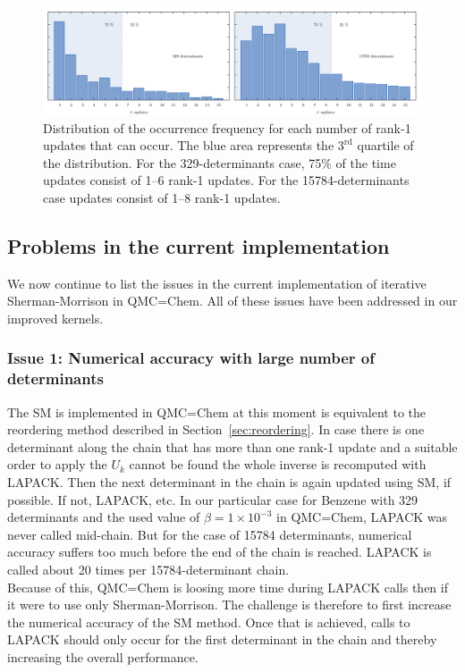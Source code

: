 \documentclass[11pt]{article}
\numberwithin{figure}{section}
\numberwithin{table}{section}
\begin{document}
    \begin{figure}[h]
    	\centering
    	\includegraphics[width=1\textwidth]{upd_freq_hor.png}
    	\caption{Distribution of the occurrence frequency for each number of rank-1 updates that can occur. The blue area represents the $3^\mathrm{rd}$ quartile of the distribution. For the 329-determinants case, 75\% of the time updates consist of 1--6 rank-1 updates. For the 15784-determinants case updates consist of 1--8 rank-1 updates.}
    	\label{fig:upd_freq}
    \end{figure}
    
    \subsection{Problems in the current implementation}
      We now continue to list the issues in the current implementation of iterative Sherman-Morrison in QMC=Chem. All of these issues have been addressed in our improved kernels.
			
    \subsubsection{Issue 1: Numerical accuracy with large number of determinants}
      The SM is implemented in QMC=Chem at this moment is equivalent to the reordering method described in Section~\ref{sec:reordering}. In case there is one determinant along the chain that has more than one rank-1 update and a suitable order to apply the $U_k$ cannot be found the whole inverse is recomputed with LAPACK. Then the next determinant in the chain is again updated using SM, if possible. If not, LAPACK, etc. In our particular case for Benzene with 329 determinants and the used value of $\beta=1\times 10^{-3}$ in QMC=Chem, LAPACK was never called mid-chain. But for the case of 15784 determinants, numerical accuracy suffers too much before the end of the chain is reached. LAPACK is called about 20 times per 15784-determinant chain.\\    
    
      Because of this, QMC=Chem is loosing more time during LAPACK calls then if it were to use only Sherman-Morrison. The challenge is therefore to first increase the numerical accuracy of the SM method. Once that is achieved, calls to LAPACK should only occur for the first determinant in the chain and thereby increasing the overall performance.\\
      
\end{document}
